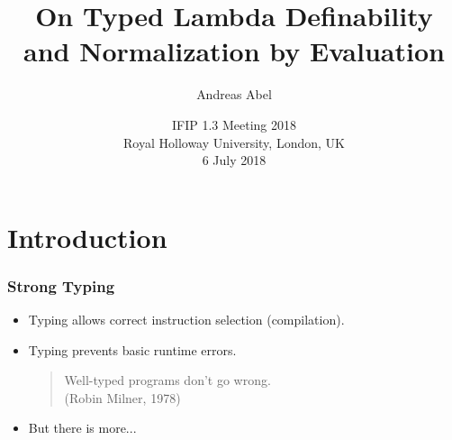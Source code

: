 \documentclass[t,fleqn,usenames,dvipsnames]{beamer}
\title[Typed Lambda Definability]{%
On Typed Lambda Definability \\ and Normalization by Evaluation}
\author[Abel]{
  Andreas Abel\inst{1}
}
\institute[] %
{
  \inst{1}
  Department of Computer Science and Engineering\\
  Chalmers and Gothenburg University, Sweden \\[1ex]
}
\date[IFIP 1.3 2018] %
{ IFIP 1.3 Meeting 2018\\
  Royal Holloway University, London, UK \\
  6 July 2018
}
\begin{document}
\maketitle


%
%
%
%




\section{Introduction}


\begin{frame}%
  \frametitle{Strong Typing}
  \vspace{-3ex}
  \begin{itemize}
  \item Typing allows correct instruction selection (compilation).
  \item Typing prevents basic runtime errors.
    \begin{quote}
      Well-typed programs don't go wrong. \\
  (Robin Milner, 1978)
    \end{quote}
  \item But there is more...
  \end{itemize}
\end{frame}
\end{document}

